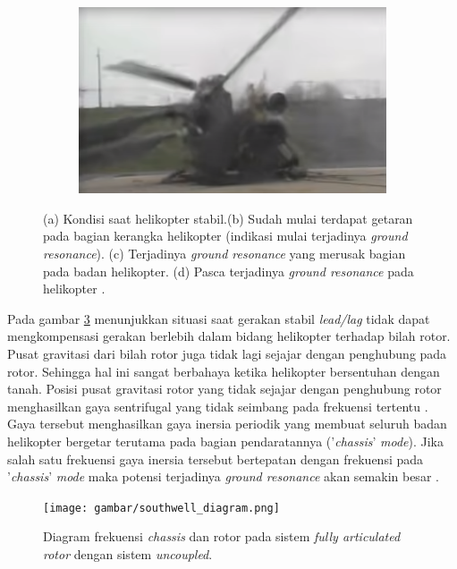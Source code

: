 \begin{figure}[H]
\begin{subfigure}{0.4\textwidth}
		\caption{}
		\label{fig:gr_3}
	\end{subfigure}
	\centering
	\begin{subfigure}{0.4\textwidth}
		\centering
		\includegraphics[width=\linewidth]{gambar/gr_4.png}
		\caption{}
		\label{fig:gr_4}
	\end{subfigure}
		\caption{(a) Kondisi saat helikopter stabil.(b) Sudah mulai terdapat getaran pada bagian kerangka helikopter (indikasi mulai terjadinya \textit{ground resonance}). (c) Terjadinya \textit{ground resonance} yang merusak bagian pada badan helikopter. (d) Pasca terjadinya \textit{ground resonance} pada helikopter \cite{squorch_2006}.}	
		\label{fig:gr}
\end{figure}

Pada gambar \ref{fig:gr} menunjukkan situasi saat gerakan stabil \textit{lead/lag} tidak dapat mengkompensasi gerakan berlebih dalam bidang helikopter terhadap bilah rotor. Pusat gravitasi dari bilah rotor juga tidak lagi sejajar dengan penghubung pada rotor. Sehingga hal ini sangat berbahaya ketika helikopter bersentuhan dengan tanah. Posisi pusat gravitasi rotor yang tidak sejajar dengan penghubung rotor menghasilkan gaya sentrifugal yang tidak seimbang pada frekuensi tertentu \cite{Eckert2007AnalyticalAA}. Gaya tersebut menghasilkan gaya inersia periodik yang membuat seluruh badan helikopter bergetar terutama pada bagian pendaratannya ('\textit{chassis}' \textit{mode}). Jika salah satu frekuensi gaya inersia tersebut bertepatan dengan frekuensi pada '\textit{chassis}' \textit{mode} maka potensi terjadinya \textit{ground resonance} akan semakin besar \cite{bramwell2001bramwell}.

\begin{figure}[H]
	\centering
	\texttt{[image: gambar/southwell\_diagram.png]}
	\caption{Diagram frekuensi \textit{chassis} dan rotor pada sistem \textit{fully articulated rotor} dengan sistem \textit{uncoupled}\cite{bramwell2001bramwell}.}
	\label{fig:southwell_diagram}
\end{figure}

